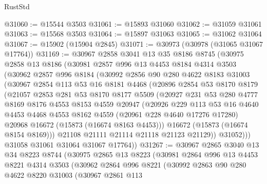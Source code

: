 \begin{lexlean}{RustStd}
\begin{coremodule}
@31060 := @15544 @3503
@31061 := @15893 @31060
@31062 := @31059 @31061
@31063 := @15568 @3503
@31064 := @15897 @31063
@31065 := @31062 @31064
@31067 := @15902 (@15904 @2845)
@31071 := @30973 (@30978 (@31065 @31067 @17764))
@31169 := @30967
    @2858
    @3041
    @13
    @35
    @8186
    @8745
    (@30975
      @2858
      @13
      @8186
      (@30981
        @2857
        @996
        @13
        @4453
        @8184
        @4314
        @3503
        (@30962
          @2857
          @996
          @8184
          (@30992
            @2856
            @90
            @280
            @4622
            @8183
            @31003
            (@30967
              @2854
              @113
              @53
              @16
              @8181
              @4468
              (@20896
                @2854
                @53
                @8170
                @8179
                (@21057
                  @2853
                  @281
                  @53
                  @8170
                  @8177
                  @5509
                  (@20927
                    @231
                    @53
                    @280
                    @4777
                    @8169
                    @8176
                    @4553
                    @8153
                    @4559
                    @20947
                    (@20926
                      @229
                      @113
                      @53
                      @16
                      @4640
                      @4453
                      @4468
                      @4553
                      @8162
                      @4559
                      (@20961 @228 @4640 @17276 @17280)
                      @20968
                      @16672
                      (@15873 (@16674 @8163 @4453)))
                    @16672
                    (@15873 (@16674 @8154 @8169)))
                  @21108
                  @21111
                  @21114
                  @21118
                  @21123
                  @21129))
              @31052)))
        @31058
        @31061
        @31064
        @31067
        @17764))
@31267 := @30967
    @2865
    @3040
    @13
    @34
    @8223
    @8744
    (@30975
      @2865
      @13
      @8223
      (@30981
        @2864
        @996
        @13
        @4453
        @8221
        @4314
        @3503
        (@30962
          @2864
          @996
          @8221
          (@30992
            @2863
            @90
            @280
            @4622
            @8220
            @31003
            (@30967
              @2861
              @113

\end{coremodule}
\end{lexlean}
